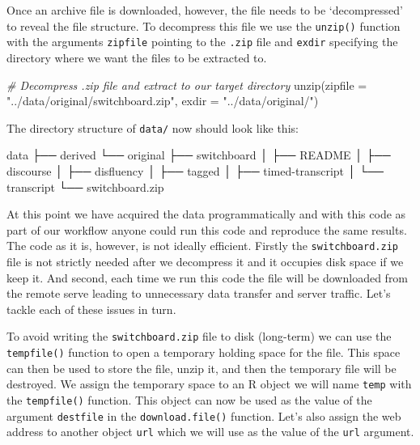 \documentclass[
  letterpaper,
]{scrbook}
\newenvironment{Shaded}{\begin{snugshade}}{\end{snugshade}}
\newcommand{\AttributeTok}[1]{\textcolor[rgb]{0.00,0.00,0.00}{#1}}
\newcommand{\CommentTok}[1]{\textcolor[rgb]{0.00,0.00,0.00}{\textit{#1}}}
\newcommand{\ExtensionTok}[1]{\textcolor[rgb]{0.00,0.00,0.00}{#1}}
\newcommand{\FunctionTok}[1]{\textcolor[rgb]{0.00,0.00,0.00}{#1}}
\newcommand{\NormalTok}[1]{\textcolor[rgb]{0.00,0.00,0.00}{#1}}
\newcommand{\StringTok}[1]{\textcolor[rgb]{0.00,0.00,0.00}{#1}}
\begin{document}
Once an archive file is downloaded, however, the file needs to be
`decompressed' to reveal the file structure. To decompress this file we
use the \texttt{unzip()} function with the arguments \texttt{zipfile}
pointing to the \texttt{.zip} file and \texttt{exdir} specifying the
directory where we want the files to be extracted to.

\begin{Shaded}
\begin{Highlighting}[]
\CommentTok{\# Decompress .zip file and extract to our target directory}
\FunctionTok{unzip}\NormalTok{(}\AttributeTok{zipfile =} \StringTok{"../data/original/switchboard.zip"}\NormalTok{, }\AttributeTok{exdir =} \StringTok{"../data/original/"}\NormalTok{)}
\end{Highlighting}
\end{Shaded}

The directory structure of \texttt{data/} now should look like this:

\begin{Shaded}
\begin{Highlighting}[]
\ExtensionTok{data}
\ExtensionTok{├──}\NormalTok{ derived}
\ExtensionTok{└──}\NormalTok{ original}
    \ExtensionTok{├──}\NormalTok{ switchboard}
    \ExtensionTok{│}\NormalTok{   ├── README}
    \ExtensionTok{│}\NormalTok{   ├── discourse}
    \ExtensionTok{│}\NormalTok{   ├── disfluency}
    \ExtensionTok{│}\NormalTok{   ├── tagged}
    \ExtensionTok{│}\NormalTok{   ├── timed{-}transcript}
    \ExtensionTok{│}\NormalTok{   └── transcript}
    \ExtensionTok{└──}\NormalTok{ switchboard.zip}
\end{Highlighting}
\end{Shaded}

At this point we have acquired the data programmatically and with this
code as part of our workflow anyone could run this code and reproduce
the same results. The code as it is, however, is not ideally efficient.
Firstly the \texttt{switchboard.zip} file is not strictly needed after
we decompress it and it occupies disk space if we keep it. And second,
each time we run this code the file will be downloaded from the remote
serve leading to unnecessary data transfer and server traffic. Let's
tackle each of these issues in turn.

To avoid writing the \texttt{switchboard.zip} file to disk (long-term)
we can use the \texttt{tempfile()} function to open a temporary holding
space for the file. This space can then be used to store the file, unzip
it, and then the temporary file will be destroyed. We assign the
temporary space to an R object we will name \texttt{temp} with the
\texttt{tempfile()} function. This object can now be used as the value
of the argument \texttt{destfile} in the \texttt{download.file()}
function. Let's also assign the web address to another object
\texttt{url} which we will use as the value of the \texttt{url}
argument.
\end{document}

